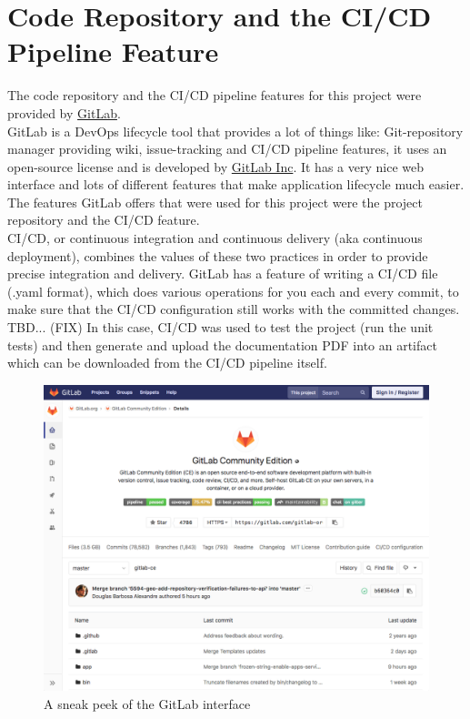 \section{Code Repository and the CI/CD Pipeline Feature}
\label{sec:GitLab}
The code repository and the CI/CD pipeline features for this project were provided by \href{https://gitlab.com/}{GitLab}.\\
GitLab is a DevOps lifecycle tool that provides a lot of things like: Git-repository manager providing wiki, issue-tracking and CI/CD pipeline features, it uses an open-source license and is developed by \href{https://about.gitlab.com/company/}{GitLab Inc}.
It has a very nice web interface and lots of different features that make application lifecycle much easier. The features GitLab offers that were used for this project were the project repository and the CI/CD feature.\\
\newline
CI/CD, or continuous integration and continuous delivery (aka continuous deployment), combines the values of these two practices in order to provide precise integration and delivery.
GitLab has a feature of writing a CI/CD file (.yaml format), which does various operations for you each and every commit, to make sure that the CI/CD configuration still works with the committed changes.\\
TBD... (FIX) In this case, CI/CD was used to test the project (run the unit tests) and then generate and upload the documentation PDF into an artifact which can be downloaded from the CI/CD pipeline itself.
\begin{figure}[H]
	\includegraphics[width=\linewidth]{./Images/Implementation/gitlab_view.png}
	\caption{A sneak peek of the GitLab interface}
\end{figure}	
	

